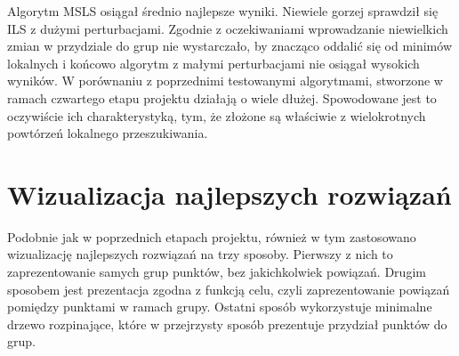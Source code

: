 \documentclass[main.tex]{subfiles}
\begin{document}
Algorytm MSLS osiągał średnio najlepsze wyniki. Niewiele gorzej sprawdził się ILS z dużymi perturbacjami. Zgodnie z oczekiwaniami wprowadzanie niewielkich zmian w przydziale do grup nie wystarczało, by znacząco oddalić się od minimów lokalnych i końcowo algorytm z małymi perturbacjami nie osiągał wysokich wyników. W porównaniu z poprzednimi testowanymi algorytmami, stworzone w ramach czwartego etapu projektu działają o wiele dłużej. Spowodowane jest to oczywiście ich charakterystyką, tym, że złożone są właściwie z wielokrotnych powtórzeń lokalnego przeszukiwania.

\section{Wizualizacja najlepszych rozwiązań}
Podobnie jak w poprzednich etapach projektu, również w tym zastosowano wizualizację najlepszych rozwiązań na trzy sposoby. Pierwszy z nich to zaprezentowanie samych grup punktów, bez jakichkolwiek powiązań. Drugim sposobem jest prezentacja zgodna z funkcją celu, czyli zaprezentowanie powiązań pomiędzy punktami w ramach grupy. Ostatni sposób wykorzystuje minimalne drzewo rozpinające, które w przejrzysty sposób prezentuje przydział punktów do grup.
\end{document}
